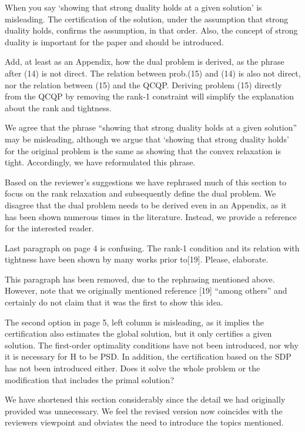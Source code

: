 When you say `showing that strong duality holds at a given solution' is misleading. The certification of the solution, under the assumption that strong duality holds, confirms the assumption, in that order. Also, the concept of strong duality is important for the paper and should be introduced. 

Add, at least as an Appendix, how the dual problem is derived, as the phrase after (14) is not direct. The relation between prob.(15) and (14) is also not direct, nor the relation between (15) and the QCQP.  Deriving problem (15) directly from the QCQP by removing the rank-1 constraint will simplify the explanation about the rank and tightness.

\begin{response}
    We agree that the phrase ``showing that strong duality holds at a given solution'' may be misleading, although we argue that `showing that strong duality holds' for the original problem is the same as showing that the convex relaxation is tight. Accordingly, we have reformulated this phrase.

    Based on the reviewer's suggestions we have rephrased much of this section to focus on the rank relaxation and subsequently define the dual problem. We disagree that the dual problem needs to be derived even in an Appendix, as it has been shown numerous times in the literature. Instead, we provide a reference for the interested reader.
\end{response}

Last paragraph on page 4 is confusing. The rank-1 condition and its relation with tightness have been shown by many works prior to[19]. Please, elaborate. 
\begin{response}
    This paragraph has been removed, due to the rephrasing mentioned above. However, note that we originally mentioned reference [19] ``among others'' and certainly do not claim that it was the first to show this idea.
\end{response}

The second option in page 5, left column is misleading, as it implies the certification also estimates the global solution, but it only certifies a given solution. 
The first-order optimality conditions have not been introduced, nor why it is necessary for H to be PSD. 
In addition, the certification based on the SDP has not been introduced either. Does it solve the whole problem or the modification that includes the primal solution? 

\begin{response}
    We have shortened this section considerably since the detail we had originally provided was unnecessary. We feel the revised version now coincides with the reviewers viewpoint and obviates the need to introduce the topics mentioned.
\end{response}

